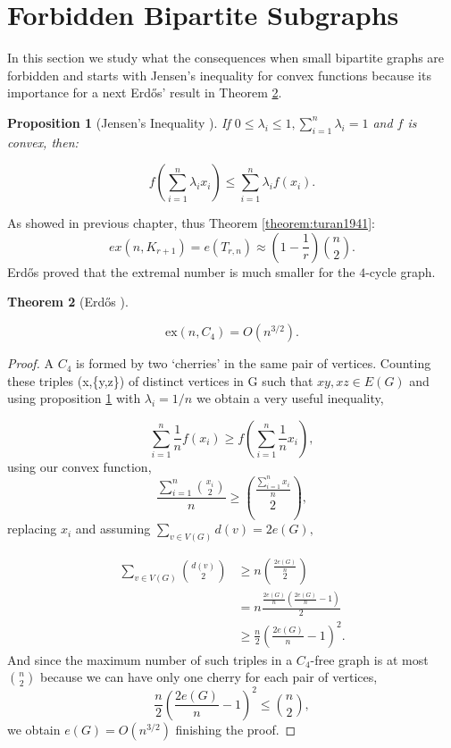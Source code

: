 \documentclass[12pt,twoside,a4paper]{book}
\numberwithin{equation}{section}
\newtheorem{theorem}             {Theorem}[section]
\newtheorem{proposition}[theorem] {Proposition}
\theoremstyle{remark}
\begin{document}
\section{Forbidden Bipartite Subgraphs}
In this section we study what the consequences when small bipartite graphs are forbidden and starts with Jensen's inequality for convex functions because its importance for a next Erd\H{o}s' result in Theorem \ref{theorem: Erdos,1938}.
\begin{proposition}[{Jensen's Inequality \cite{Je06}}]\label{prep:jensen}
 If $0\leq \lambda_i \leq 1, \sum_{i=1}^n \lambda_i = 1$ and $f$ is convex, then:

$$
f \left( \sum_{i=1}^n \lambda_i x_i\right) \leq \sum_{i=1}^n \lambda_i f (x_i).
$$

\end{proposition}

As showed in previous chapter, thus Theorem \ref{theorem:turan1941}:
$$ ex(n,K_{r+1}) = e(T_{r,n}) \approx \left( 1-\frac{1}{r}\right) \binom{n}{2} .$$
Erd\H{o}s proved that the extremal number is much smaller for the $4$-cycle graph.
 
\begin{theorem}[{Erd\H{o}s \cite{Er38}}] \label{theorem: Erdos,1938}

$$\text{ex}(n,C_4) = O(n^{3/2}).$$
\end{theorem}

\begin{proof}
A $C_4$ is formed by two `cherries' in the same pair of vertices. Counting these triples (x,\{y,z\}) of distinct vertices in G such that $xy, xz \in E(G)$ and using proposition \ref{prep:jensen} with $\lambda_i = 1/n$ we obtain a very useful inequality,

$$ \sum_{i=1}^n \frac{1}{n} f\left(x_i\right) \geq f\left(\sum_{i=1}^n \frac{1}{n} x_i\right),$$
using our convex function,
$$ \frac{\sum_{i=1}^n \binom{x_i}{2}}{n} \geq \binom{\frac{\sum_{i=1}^n x_i}{n}}{2} ,$$
replacing $x_i$ and assuming $\sum_{v \in V(G)} d(v) = 2e(G),$

\begin{align*}
\sum_{v \in V(G)} \binom{d(v)}{2} &\geq n \binom{\frac{2e(G)}{n}}{2}\\
&= n\frac{\frac{2e(G)}{n}\left( \frac{2e(G)}{n}-1\right)}{2} \\
&\geq \frac{n}{2} \left( \frac{2e(G)}{n} - 1 \right)^2.
\end{align*}
And since the maximum number of such triples in a $C_4$-free graph is at most $\binom{n}{2}$ because we can have only one cherry for each pair of vertices,
$$ \frac{n}{2}\left(\frac{2e(G)}{n} - 1\right)^2 \leq \binom{n}{2},$$
we obtain $e(G) = O(n^{3/2})$ finishing the proof.
\end{proof}
\end{document}
